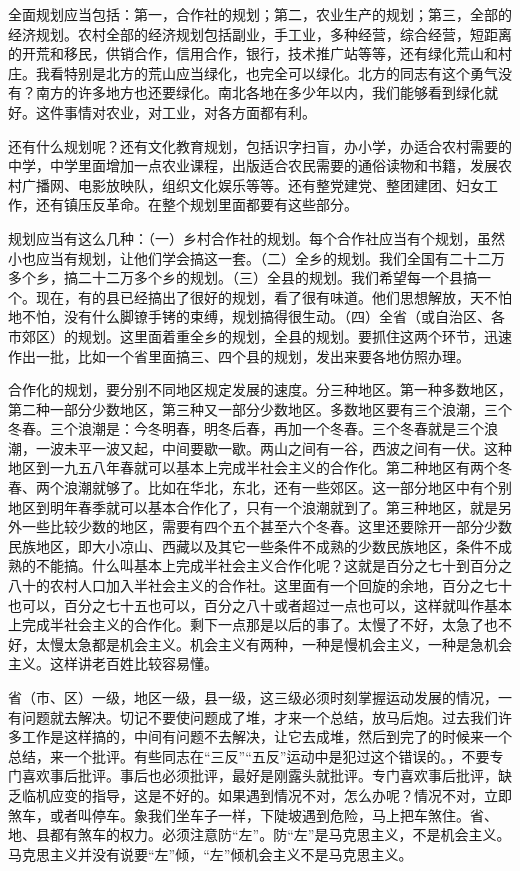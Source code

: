全面规划应当包括：第一，合作社的规划；第二，农业生产的规划；第三，全部的经济规划。农村全部的经济规划包括副业，手工业，多种经营，综合经营，短距离的开荒和移民，供销合作，信用合作，银行，技术推广站等等，还有绿化荒山和村庄。我看特别是北方的荒山应当绿化，也完全可以绿化。北方的同志有这个勇气没有？南方的许多地方也还要绿化。南北各地在多少年以内，我们能够看到绿化就好。这件事情对农业，对工业，对各方面都有利。

还有什么规划呢？还有文化教育规划，包括识字扫盲，办小学，办适合农村需要的中学，中学里面增加一点农业课程，出版适合农民需要的通俗读物和书籍，发展农村广播网、电影放映队，组织文化娱乐等等。还有整党建党、整团建团、妇女工作，还有镇压反革命。在整个规划里面都要有这些部分。

规划应当有这么几种：（一）乡村合作社的规划。每个合作社应当有个规划，虽然小也应当有规划，让他们学会搞这一套。（二）全乡的规划。我们全国有二十二万多个乡，搞二十二万多个乡的规划。（三）全县的规划。我们希望每一个县搞一个。现在，有的县已经搞出了很好的规划，看了很有味道。他们思想解放，天不怕地不怕，没有什么脚镣手铐的束缚，规划搞得很生动。（四）全省（或自治区、各市郊区）的规划。这里面着重全乡的规划，全县的规划。要抓住这两个环节，迅速作出一批，比如一个省里面搞三、四个县的规划，发出来要各地仿照办理。

合作化的规划，要分别不同地区规定发展的速度。分三种地区。第一种多数地区，第二种一部分少数地区，第三种又一部分少数地区。多数地区要有三个浪潮，三个冬春。三个浪潮是：今冬明春，明冬后春，再加一个冬春。三个冬春就是三个浪潮，一波未平一波又起，中间要歇一歇。两山之间有一谷，西波之间有一伏。这种地区到一九五八年春就可以基本上完成半社会主义的合作化。第二种地区有两个冬春、两个浪潮就够了。比如在华北，东北，还有一些郊区。这一部分地区中有个别地区到明年春季就可以基本合作化了，只有一个浪潮就到了。第三种地区，就是另外一些比较少数的地区，需要有四个五个甚至六个冬春。这里还要除开一部分少数民族地区，即大小凉山、西藏以及其它一些条件不成熟的少数民族地区，条件不成熟的不能搞。什么叫基本上完成半社会主义合作化呢？这就是百分之七十到百分之八十的农村人口加入半社会主义的合作社。这里面有一个回旋的余地，百分之七十也可以，百分之七十五也可以，百分之八十或者超过一点也可以，这样就叫作基本上完成半社会主义的合作化。剩下一点那是以后的事了。太慢了不好，太急了也不好，太慢太急都是机会主义。机会主义有两种，一种是慢机会主义，一种是急机会主义。这样讲老百姓比较容易懂。

省（市、区）一级，地区一级，县一级，这三级必须时刻掌握运动发展的情况，一有问题就去解决。切记不要使问题成了堆，才来一个总结，放马后炮。过去我们许多工作是这样搞的，中间有问题不去解决，让它去成堆，然后到完了的时候来一个总结，来一个批评。有些同志在“三反”“五反”运动中是犯过这个错误的。，不要专门喜欢事后批评。事后也必须批评，最好是刚露头就批评。专门喜欢事后批评，缺乏临机应变的指导，这是不好的。如果遇到情况不对，怎么办呢？情况不对，立即煞车，或者叫停车。象我们坐车子一样，下陡坡遇到危险，马上把车煞住。省、地、县都有煞车的权力。必须注意防“左”。防“左”是马克思主义，不是机会主义。马克思主义并没有说要“左”倾，“左”倾机会主义不是马克思主义。

